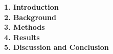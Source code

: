\documentclass[a4, 12pt]{article}
\begin{document}
\textbf{1. Introduction}\\
\textbf{2.  Background}\\
\textbf{3. Methods}\\
\textbf{4. Results}\\
\textbf{5. Discussion and Conclusion}
\end{document}
